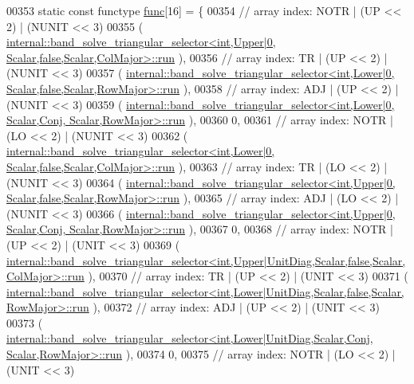 \begin{DoxyCode}
00353   \textcolor{keyword}{static} \textcolor{keyword}{const} functype \hyperlink{structfunc}{func}[16] = \{
00354     \textcolor{comment}{// array index: NOTR  | (UP << 2) | (NUNIT << 3)}
00355     (
      \hyperlink{structinternal_1_1band__solve__triangular__selector}{internal::band\_solve\_triangular\_selector<int,Upper|0,       Scalar,false,Scalar,ColMajor>::run}
      ),
00356     \textcolor{comment}{// array index: TR    | (UP << 2) | (NUNIT << 3)}
00357     (
      \hyperlink{structinternal_1_1band__solve__triangular__selector}{internal::band\_solve\_triangular\_selector<int,Lower|0,       Scalar,false,Scalar,RowMajor>::run}
      ),
00358     \textcolor{comment}{// array index: ADJ   | (UP << 2) | (NUNIT << 3)}
00359     (
      \hyperlink{structinternal_1_1band__solve__triangular__selector}{internal::band\_solve\_triangular\_selector<int,Lower|0,       Scalar,Conj, Scalar,RowMajor>::run}
      ),
00360     0,
00361     \textcolor{comment}{// array index: NOTR  | (LO << 2) | (NUNIT << 3)}
00362     (
      \hyperlink{structinternal_1_1band__solve__triangular__selector}{internal::band\_solve\_triangular\_selector<int,Lower|0,       Scalar,false,Scalar,ColMajor>::run}
      ),
00363     \textcolor{comment}{// array index: TR    | (LO << 2) | (NUNIT << 3)}
00364     (
      \hyperlink{structinternal_1_1band__solve__triangular__selector}{internal::band\_solve\_triangular\_selector<int,Upper|0,       Scalar,false,Scalar,RowMajor>::run}
      ),
00365     \textcolor{comment}{// array index: ADJ   | (LO << 2) | (NUNIT << 3)}
00366     (
      \hyperlink{structinternal_1_1band__solve__triangular__selector}{internal::band\_solve\_triangular\_selector<int,Upper|0,       Scalar,Conj, Scalar,RowMajor>::run}
      ),
00367     0,
00368     \textcolor{comment}{// array index: NOTR  | (UP << 2) | (UNIT  << 3)}
00369     (
      \hyperlink{structinternal_1_1band__solve__triangular__selector}{internal::band\_solve\_triangular\_selector<int,Upper|UnitDiag,Scalar,false,Scalar,ColMajor>::run}
      ),
00370     \textcolor{comment}{// array index: TR    | (UP << 2) | (UNIT  << 3)}
00371     (
      \hyperlink{structinternal_1_1band__solve__triangular__selector}{internal::band\_solve\_triangular\_selector<int,Lower|UnitDiag,Scalar,false,Scalar,RowMajor>::run}
      ),
00372     \textcolor{comment}{// array index: ADJ   | (UP << 2) | (UNIT  << 3)}
00373     (
      \hyperlink{structinternal_1_1band__solve__triangular__selector}{internal::band\_solve\_triangular\_selector<int,Lower|UnitDiag,Scalar,Conj, Scalar,RowMajor>::run}
      ),
00374     0,
00375     \textcolor{comment}{// array index: NOTR  | (LO << 2) | (UNIT  << 3)}

\end{DoxyCode}
